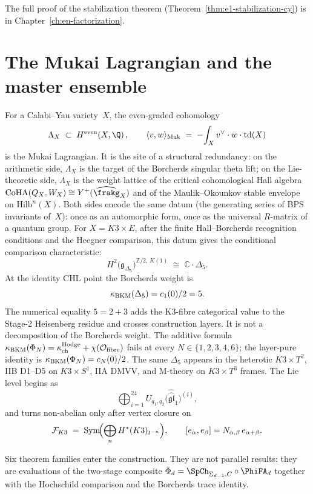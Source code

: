 The full proof of the stabilization theorem
(Theorem~\ref{thm:e1-stabilization-cy}) is in
Chapter~\ref{ch:en-factorization}.

\section{The Mukai Lagrangian and the master ensemble}
\label{sec:mukai-lagrangian-ensemble}

For a Calabi--Yau variety~$X$, the even-graded cohomology
\[
 \Lambda_X \;\subset\; H^{\mathrm{even}}(X,\Q)\,,
 \qquad
 \langle v, w \rangle_{\mathrm{Muk}}
 \;=\; -\!\int_X v^\vee \cdot w \cdot \mathrm{td}(X)
\]
is the Mukai Lagrangian. It is the site of a structural
redundancy: on the arithmetic side, $\Lambda_X$ is the target
of the Borcherds singular theta lift; on the Lie-theoretic
side, $\Lambda_X$ is the weight lattice of the critical
cohomological Hall algebra $\CoHA(Q_X, W_X) \cong
Y^+(\widehat{\frakg}_X)$ and of the Maulik--Okounkov stable
envelope on $\mathrm{Hilb}^n(X)$. Both sides encode the same
datum (the generating series of BPS invariants of~$X$): once
as an automorphic form, once as the universal $R$-matrix of a
quantum group.
For $X=K3\times E$, after the finite Hall--Borcherds recognition conditions
and the Heegner comparison, this datum gives the conditional comparison
characteristic:
\[
 H^2\bigl(\mathfrak{g}_{\Delta_5}\bigr)^{\mathbb{Z}/2,\,K(1)}
 \;\cong\;
 \mathbb{C}\cdot\Delta_5.
\]
At the identity CHL point the Borcherds weight is
\[
 \kappa_{\mathrm{BKM}}(\Delta_5)=c_1(0)/2=5.
\]
The numerical equality \(5=2+3\) adds the K3-fibre categorical value to
the Stage-2 Heisenberg residue and crosses construction layers. It is
not a decomposition of the Borcherds weight. The additive formula
$\kappa_{\mathrm{BKM}}(\Phi_N) = \kappa_{\mathrm{ch}}^{\mathrm{Hodge}} + \chi(\mathcal{O}_{\mathrm{fibre}})$ fails at every
$N \in \{1,2,3,4,6\}$; the layer-pure identity is
$\kappa_{\mathrm{BKM}}(\Phi_N) = c_N(0)/2$. The same $\Delta_5$ appears in the heterotic
$K3\times T^2$, IIB D1--D5 on $K3\times S^1$, IIA DMVV, and
M-theory on $K3\times T^3$ frames. The Lie level begins as
\[
 \bigoplus_{i=1}^{24}
 U_{q_1,q_2}\bigl(\widehat{\widehat{\mathfrak{gl}}}_1\bigr)^{(i)},
\]
and turns non-abelian only after vertex closure on
\[
 \mathcal{F}_{K3}
 \;=\;
 \mathrm{Sym}\!\Bigl(\bigoplus_n H^*(K3)_{t^{-n}}\Bigr),
 \qquad
 [e_\alpha,e_\beta] = N_{\alpha,\beta}\,e_{\alpha+\beta}.
\]

Six theorem families enter the construction. They are not parallel
results: they are evaluations of the two-stage composite
$\Phi_d = \SpCh_{\Sigma_{d-1}, C}\circ\PhiFA_d$ together with
the Hochschild comparison and the Borcherds trace identity.

